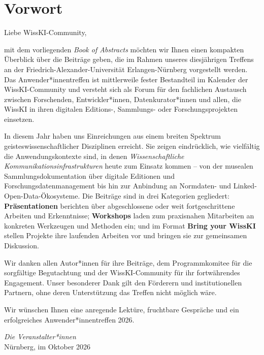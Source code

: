 \clearpage
{}
{}
\section*{Vorwort}

Liebe WissKI-Community,

mit dem vorliegenden \emph{Book of Abstracts} möchten wir Ihnen einen kompakten Überblick über die Beiträge geben, die im Rahmen unseres diesjährigen Treffens an der Friedrich-Alexander-Universität Erlangen-Nürnberg vorgestellt werden. Das Anwender*innentreffen ist mittlerweile fester Bestandteil im Kalender der WissKI-Community und versteht sich als Forum für den fachlichen Austausch zwischen Forschenden, Ent\-wick\-ler*in\-nen, Datenkurator*innen und allen, die WissKI in ihren digitalen Editions-, Sammlungs- oder Forschungsprojekten einsetzen.

In diesem Jahr haben uns Einreichungen aus einem breiten Spektrum geisteswissenschaftlicher Disziplinen erreicht. Sie zeigen eindrücklich, wie vielfältig die Anwendungskontexte sind, in denen \emph{Wissenschaftliche Kommunikationsinfrastrukturen} heute zum Einsatz kommen -- von der musealen Sammlungsdokumentation über digitale Editionen und Forschungsdatenmanagement bis hin zur Anbindung an Normdaten- und Linked-Open-Data-Ökosysteme. Die Beiträge sind in drei Kategorien gegliedert: \textbf{Präsentationen} berichten über abgeschlossene oder weit fortgeschrittene Arbeiten und Erkenntnisse; \textbf{Workshops} laden zum praxisnahen Mitarbeiten an konkreten Werkzeugen und Methoden ein; und im Format \textbf{Bring your WissKI} stellen Projekte ihre laufenden Arbeiten vor und bringen sie zur gemeinsamen Diskussion.

Wir danken allen Autor*innen für ihre Beiträge, dem Programmkomitee für die sorgfältige Begutachtung und der WissKI-Community für ihr fortwährendes Engagement. Unser besonderer Dank gilt den Förderern und institutionellen Partnern, ohne deren Unterstützung das Treffen nicht möglich wäre.

Wir wünschen Ihnen eine anregende Lektüre, fruchtbare Gespräche und ein erfolgreiches Anwender*innentreffen 2026.

\vspace{1cm}

\noindent\textit{Die Veranstalter*innen}\\
Nürnberg, im Oktober 2026
